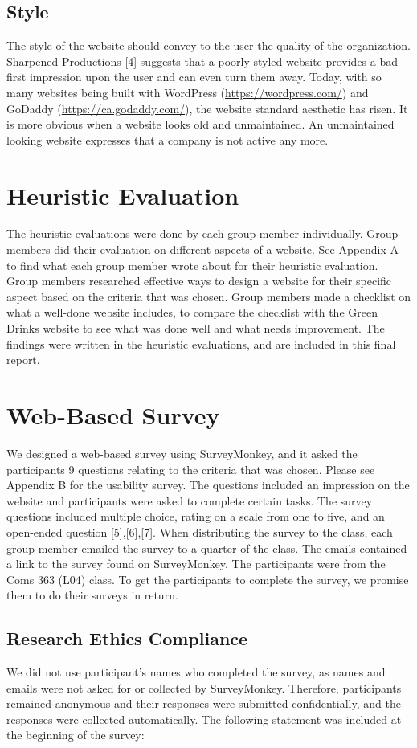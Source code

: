 \documentclass[12pt]{article}
\begin{document}
\subsection{Style}
The style of the website should convey to the user the quality of the organization. Sharpened Productions [4] suggests that a poorly styled website provides a bad first impression upon the user and can even turn them away. Today, with so many websites being built with WordPress (\url{https://wordpress.com/}) and GoDaddy (\url{https://ca.godaddy.com/}), the website standard aesthetic has risen. It is more obvious when a website looks old and unmaintained. An unmaintained looking website expresses that a company is not active any more.
\section{Heuristic Evaluation}
The heuristic evaluations were done by each group member individually. Group members did their evaluation on different aspects of a website. See Appendix A to find what each group member wrote about for their heuristic evaluation. Group members researched effective ways to design a website for their specific aspect based on the criteria that was chosen. Group members made a checklist on what a well-done website includes, to compare the checklist with the Green Drinks website to see what was done well and what needs improvement. The findings were written in the heuristic evaluations, and are included in this final report.


\section{Web-Based Survey}
We designed a web-based survey using SurveyMonkey, and it asked the participants 9 questions relating to the criteria that was chosen. Please see Appendix B for the usability survey.  The questions included an impression on the website and participants were asked to complete certain tasks. The survey questions included multiple choice, rating on a scale from one to five, and an open-ended question [5],[6],[7]. When distributing the survey to the class, each group member emailed the survey to a quarter of the class. The emails contained a link to the survey found on SurveyMonkey. The participants were from the Coms 363 (L04) class. To get the participants to complete the survey, we promise them to do their surveys in return. 
\subsection{Research Ethics Compliance}
We did not use participant’s names who completed the survey, as names and emails were not asked for or collected by SurveyMonkey. Therefore, participants remained anonymous and their responses were submitted confidentially, and the responses were collected automatically. The following statement was included at the beginning of the survey:
\end{document}
